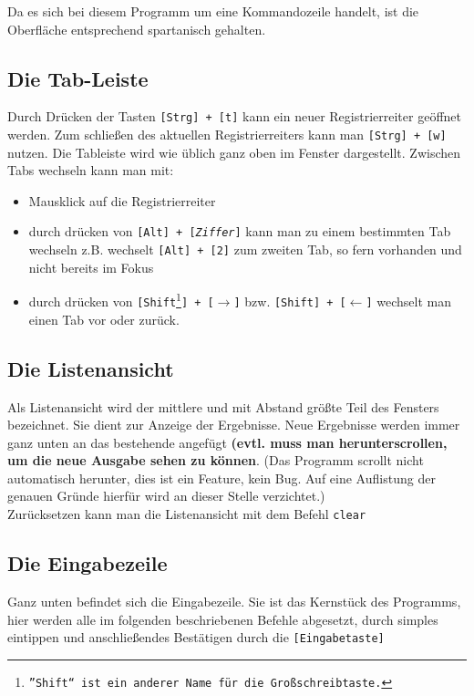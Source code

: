 \documentclass[a4paper]{scrartcl}
\let\origitem\item
\renewcommand{\item}{\normalfont\origitem}
\begin{document}
Da es sich bei diesem Programm um eine Kommandozeile handelt, ist die Oberfläche entsprechend spartanisch gehalten. 

\subsection{Die Tab-Leiste}
Durch Drücken der Tasten \texttt{[Strg] + [t]} kann ein neuer Registrierreiter geöffnet werden. Zum schließen des aktuellen Registrierreiters kann man \texttt{[Strg] + [w]} nutzen.
Die Tableiste wird wie üblich ganz oben im Fenster dargestellt. Zwischen Tabs wechseln kann man mit:
\begin{itemize}
\item Mausklick auf die Registrierreiter
\item durch drücken von \texttt{[Alt] + [\textit{Ziffer}]} kann man zu einem bestimmten Tab wechseln
	\subitem z.B. wechselt \texttt{[Alt] + [2]} zum zweiten Tab, so fern vorhanden und nicht bereits im Fokus
\item durch drücken von \texttt{[Shift\footnote{''Shift`` ist ein anderer Name für die Großschreibtaste.}] + [$\rightarrow$]} bzw. \texttt{[Shift] + [$\leftarrow$]} wechselt man einen Tab vor oder zurück. %
\end{itemize}

\subsection{Die Listenansicht}
Als Listenansicht wird der mittlere und mit Abstand größte Teil des Fensters bezeichnet. Sie dient zur Anzeige der Ergebnisse. 
Neue Ergebnisse werden immer ganz unten an das bestehende angefügt \textbf{(evtl. muss man herunterscrollen, um die neue Ausgabe sehen zu können}. (Das Programm scrollt nicht automatisch herunter, dies ist ein Feature, kein Bug. Auf eine Auflistung der genauen Gründe hierfür wird an dieser Stelle verzichtet.)\\

Zurücksetzen kann man die Listenansicht mit dem Befehl \texttt{clear}

\subsection{Die Eingabezeile}
Ganz unten befindet sich die Eingabezeile.
Sie ist das Kernstück des Programms, hier werden alle im folgenden beschriebenen Befehle abgesetzt, durch simples eintippen und anschließendes Bestätigen durch die \texttt{[Eingabetaste]}\\
\end{document}
